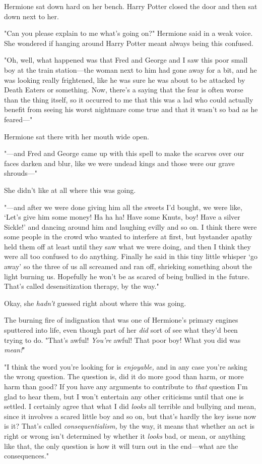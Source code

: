 Hermione sat down hard on her bench. Harry Potter closed the door and then sat
down next to her.

"Can you please explain to me what's going on?" Hermione said in a weak voice.
She wondered if hanging around Harry Potter meant always being this confused.

"Oh, well, what happened was that Fred and George and I saw this poor small boy
at the train station—the woman next to him had gone away for a bit, and he
was looking really frightened, like he was sure he was about to be attacked by
Death Eaters or something. Now, there's a saying that the fear is often worse
than the thing itself, so it occurred to me that this was a lad who could
actually benefit from seeing his worst nightmare come true and that it wasn't
so bad as he feared—"

Hermione sat there with her mouth wide open.

"—and Fred and George came up with this spell to make the scarves over our
faces darken and blur, like we were undead kings and those were our grave
shrouds—"

She didn't like at all where this was going.

"—and after we were done giving him all the sweets I'd bought, we were like,
`Let's give him some money! Ha ha ha! Have some Knuts, boy! Have a silver
Sickle!' and dancing around him and laughing evilly and so on. I think there
were some people in the crowd who wanted to interfere at first, but bystander
apathy held them off at least until they saw what we were doing, and then I
think they were all too confused to do anything. Finally he said in this tiny
little whisper `go away' so the three of us all screamed and ran off, shrieking
something about the light burning us. Hopefully he won't be as scared of being
bullied in the future. That's called desensitization therapy, by the way."

Okay, she \emph{hadn't} guessed right about where this was going.

The burning fire of indignation that was one of Hermione's primary engines
sputtered into life, even though part of her \emph{did} sort of see what they'd
been trying to do. "That's awful! \emph{You're} awful! That poor boy! What you
did was \emph{mean!}"

"I think the word you're looking for is \emph{enjoyable,} and in any case
you're asking the wrong question. The question is, did it do more good than
harm, or more harm than good? If you have any arguments to contribute to
\emph{that} question I'm glad to hear them, but I won't entertain any other
criticisms until that one is settled. I certainly agree that what I did
\emph{looks} all terrible and bullying and mean, since it involves a scared
little boy and so on, but that's hardly the key issue now is it? That's called
\emph{consequentialism,} by the way, it means that whether an act is right or
wrong isn't determined by whether it \emph{looks} bad, or mean, or anything
like that, the only question is how it will turn out in the end—what are the
consequences."

